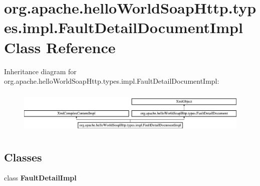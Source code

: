 \hypertarget{classorg_1_1apache_1_1hello_world_soap_http_1_1types_1_1impl_1_1_fault_detail_document_impl}{}\section{org.\+apache.\+hello\+World\+Soap\+Http.\+types.\+impl.\+Fault\+Detail\+Document\+Impl Class Reference}
\label{classorg_1_1apache_1_1hello_world_soap_http_1_1types_1_1impl_1_1_fault_detail_document_impl}
Inheritance diagram for org.\+apache.\+hello\+World\+Soap\+Http.\+types.\+impl.\+Fault\+Detail\+Document\+Impl\+:\begin{figure}[H]
\begin{center}
\leavevmode
\includegraphics[height=2.089552cm]{classorg_1_1apache_1_1hello_world_soap_http_1_1types_1_1impl_1_1_fault_detail_document_impl}
\end{center}
\end{figure}
\subsection*{Classes}
\begin{DoxyCompactItemize}
\item 
class {\bfseries Fault\+Detail\+Impl}
\end{DoxyCompactItemize}
